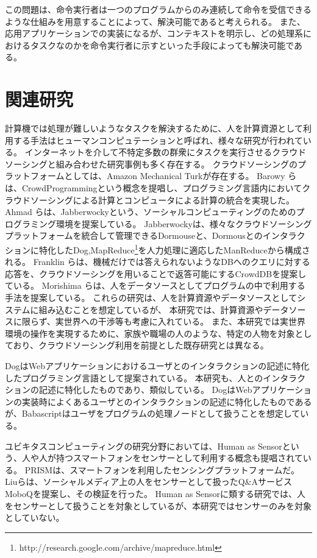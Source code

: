 \documentclass[twoside]{wiss}
\begin{document}
この問題は、命令実行者は一つのプログラムからのみ連続して命令を受信できるような仕組みを用意することによって、解決可能であると考えられる。
また、応用アプリケーションでの実装になるが、コンテキストを明示し、どの処理系におけるタスクなのかを命令実行者に示すといった手段によっても解決可能である。

\section{関連研究}

計算機では処理が難しいようなタスクを解決するために、人を計算資源として利用する手法はヒューマンコンピュテーション\cite{humancomputation}と呼ばれ、様々な研究が行われている。
インターネットを介して不特定多数の群衆にタスクを実行させるクラウドソーシングと組み合わせた研究事例も多く存在する。
クラウドソーシングのプラットフォームとしては、Amazon Mechanical Turk\cite{mechanicalturk}が存在する。
Barowy らは、CrowdProgrammingという概念を提唱し、プログラミング言語内においてクラウドソーシングによる計算とコンピュータによる計算の統合を実現した\cite{automan}。
Ahmad らは、Jabberwocky\cite{jabberwocky}という、ソーシャルコンピューティングのためのプログラミング環境を提案している。
Jabberwockyは、様々なクラウドソーシングプラットフォームを統合して管理できるDormouseと、Dormousとのインタラクションに特化したDog,MapReduce\footnote{http://research.google.com/archive/mapreduce.html}を人力処理に適応したManReduceから構成される。
Franklin らは、機械だけでは答えられないようなDBへのクエリに対する応答を、クラウドソーシングを用いることで返答可能にするCrowdDBを提案している\cite{crowddb}。
Morishima らは、人をデータソースとしてプログラムの中で利用する手法を提案している\cite{cylog}。
これらの研究は、人を計算資源やデータソースとしてシステムに組み込むことを想定しているが、
本研究では、計算資源やデータソースに限らず、実世界への干渉等も考慮に入れている。
また、本研究では実世界環境の操作を実現するために、家族や職場の人のような、特定の人物を対象としており、クラウドソーシング利用を前提とした既存研究とは異なる。

Dog\cite{dog}はWebアプリケーションにおけるユーザとのインタラクションの記述に特化したプログラミング言語として提案されている。
本研究も、人とのインタラクションの記述に特化したものであり、類似している。
DogはWebアプリケーションの実装時によくあるユーザとのインタラクションの記述に特化したものであるが、Babascriptはユーザをプログラムの処理ノードとして扱うことを想定している。

ユビキタスコンピューティングの研究分野においては、Human as Sensorという、人や人が持つスマートフォンをセンサーとして利用する概念も提唱されている。
PRISMは、スマートフォンを利用したセンシングプラットフォームだ\cite{prism}。
Liuらは、ソーシャルメディア上の人をセンサーとして扱ったQ\&AサービスMoboQを提案し、その検証を行った。
Human as Sensorに類する研究では、人をセンサーとして扱うことを対象としているが、本研究ではセンサーのみを対象としていない。
\end{document}
